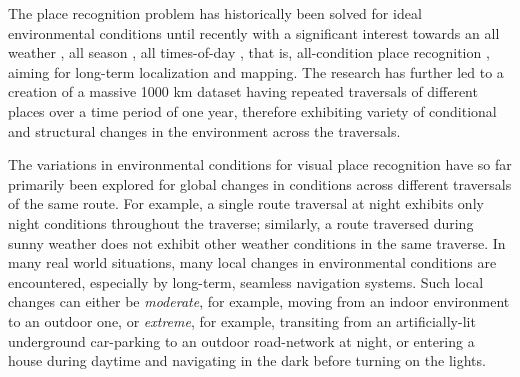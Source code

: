 \documentclass[letterpaper, 10 pt, conference]{ieeeconf}  %
\begin{document}
The place recognition problem has historically been solved for ideal environmental conditions \cite{thompson1993vision,Cummins2009} until recently with a significant interest towards an all weather \cite{linegar2016made}, all season \cite{McManus2015,chen2017deep}, all times-of-day \cite{linegar2015work}, that is,  all-condition place recognition \cite{Milford2012},  aiming for long-term localization and mapping. The research has further led to a creation of a massive 1000 km dataset \cite{maddern20161} having repeated traversals of different places over a time period of one year, therefore exhibiting variety of conditional and structural changes in the environment across the traversals.

The variations in environmental conditions for visual place recognition have so far primarily been explored for global changes in conditions across different traversals of the same route. For example, a single route traversal at night exhibits only night conditions throughout the traverse; similarly, a route traversed during sunny weather does not exhibit other weather conditions in the same traverse. In many real world situations, many local changes in environmental conditions are encountered, especially by long-term, seamless navigation systems. Such local changes can either be \emph{moderate}, for example, moving from an indoor environment to an outdoor one, or \emph{extreme}, for example, transiting from an artificially-lit underground car-parking to an outdoor road-network at night, or entering a house during daytime and navigating in the dark before turning on the lights.  
\end{document}
